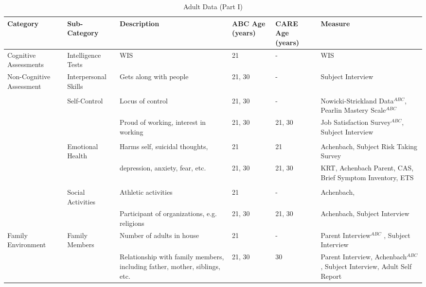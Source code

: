 \begin{sidewaystable}[H]							
\begin{threeparttable}								
\small										
\caption{Adult Data (Part I)} \label{tab:adultvars_1}						\centering										
\scriptsize										
\begin{tabular}{L{3.5cm} C{3.5cm} C{5cm} C{1.5cm} C{1.8cm} C{6cm}}										
\toprule
\textbf{Category}	&	\textbf{Sub-Category}	&	\textbf{Description}	&	\textbf{ABC Age (years)}  	&  \textbf{CARE Age (years)}  & 	\textbf{Measure}	\\ \midrule
Cognitive Assessments   	&	       Intelligence Tests      	&	       WIS     	&	21	&	-	&	       WIS     \\
\midrule										
Non-Cognitive Assessment        	&	       Interpersonal Skills    	&	       Gets along with people  	&	       21, 30  	&	-	&	       Subject Interview   \\
\\										
        	&	       Self-Control    	&	       Locus of control        	&	       21, 30  	&	-	&	       Nowicki-Strickland Data$^{ABC}$, Pearlin Mastery Scale$^{ABC}$  \\
        	&	               	&	       Proud of working, interest in working   	&	       21, 30  	&	21, 30	&	       Job Satisfaction Survey$^{ABC}$, Subject Interview       \\
\\										
        	&	       Emotional Health        	&	       Harms self, suicidal thoughts,	&	21	&	21	&	       Achenbach,  Subject Risk Taking Survey   \\
        	&	               	&	       depression, anxiety, fear, etc. 	&	       21, 30  	&	21, 30	&	       KRT, Achenbach Parent,  CAS, Brief Symptom Inventory, ETS\\
\\										
        	&	       Social Activities       	&	       Athletic activities     	&	21	&	-	&	       Achenbach,  \\
        	&	               	&	       Participant of organizations, e.g. religions    	&	       21, 30  	&	21, 30	&	       Achenbach, Subject Interview        \\
\midrule										
Family Environment      	&	       Family Members  	&	       Number of adults in house       	&	21	&	-	&	       Parent Interview$^{ABC}$ , Subject Interview    \\
        	&	               	&	       Relationship with family members, including father, mother, siblings, etc.      	&	       21, 30  	&	30	&	      Parent Interview, Achenbach$^{ABC}$, Subject Interview, Adult Self Report \\

\end{tabular}
\end{threeparttable}
\end{sidewaystable}
